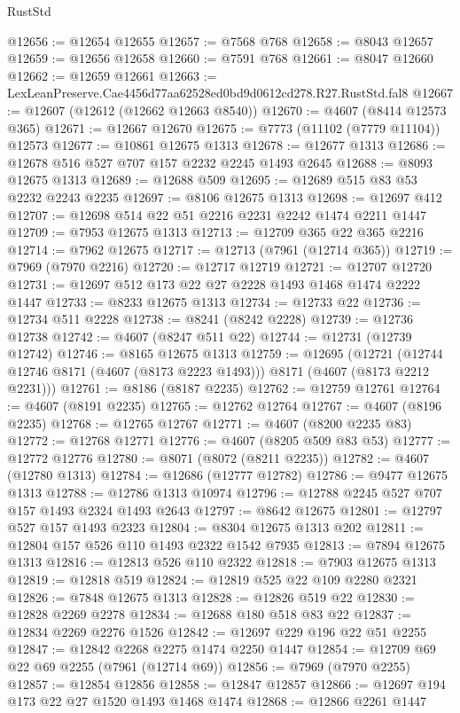 \begin{lexlean}{RustStd}
\begin{coremodule}
@12656 := @12654 @12655
@12657 := @7568 @768
@12658 := @8043 @12657
@12659 := @12656 @12658
@12660 := @7591 @768
@12661 := @8047 @12660
@12662 := @12659 @12661
@12663 := LexLeanPreserve.Cae4456d77aa62528ed0bd9d0612cd278.R27.RustStd.fal8
@12667 := @12607 (@12612 (@12662 @12663 @8540))
@12670 := @4607 (@8414 @12573 @365)
@12671 := @12667 @12670
@12675 := @7773 (@11102 (@7779 @11104)) @12573
@12677 := @10861 @12675 @1313
@12678 := @12677 @1313
@12686 := @12678 @516 @527 @707 @157 @2232 @2245 @1493 @2645
@12688 := @8093 @12675 @1313
@12689 := @12688 @509
@12695 := @12689 @515 @83 @53 @2232 @2243 @2235
@12697 := @8106 @12675 @1313
@12698 := @12697 @412
@12707 := @12698 @514 @22 @51 @2216 @2231 @2242 @1474 @2211 @1447
@12709 := @7953 @12675 @1313
@12713 := @12709 @365 @22 @365 @2216
@12714 := @7962 @12675
@12717 := @12713 (@7961 (@12714 @365))
@12719 := @7969 (@7970 @2216)
@12720 := @12717 @12719
@12721 := @12707 @12720
@12731 := @12697 @512 @173 @22 @27 @2228 @1493 @1468 @1474 @2222 @1447
@12733 := @8233 @12675 @1313
@12734 := @12733 @22
@12736 := @12734 @511 @2228
@12738 := @8241 (@8242 @2228)
@12739 := @12736 @12738
@12742 := @4607 (@8247 @511 @22)
@12744 := @12731 (@12739 @12742)
@12746 := @8165 @12675 @1313
@12759 := @12695
    (@12721 (@12744 @12746 @8171 (@4607 (@8173 @2223 @1493))) @8171 (@4607 (@8173 @2212 @2231)))
@12761 := @8186 (@8187 @2235)
@12762 := @12759 @12761
@12764 := @4607 (@8191 @2235)
@12765 := @12762 @12764
@12767 := @4607 (@8196 @2235)
@12768 := @12765 @12767
@12771 := @4607 (@8200 @2235 @83)
@12772 := @12768 @12771
@12776 := @4607 (@8205 @509 @83 @53)
@12777 := @12772 @12776
@12780 := @8071 (@8072 (@8211 @2235))
@12782 := @4607 (@12780 @1313)
@12784 := @12686 (@12777 @12782)
@12786 := @9477 @12675 @1313
@12788 := @12786 @1313 @10974
@12796 := @12788 @2245 @527 @707 @157 @1493 @2324 @1493 @2643
@12797 := @8642 @12675
@12801 := @12797 @527 @157 @1493 @2323
@12804 := @8304 @12675 @1313 @202
@12811 := @12804 @157 @526 @110 @1493 @2322 @1542 @7935
@12813 := @7894 @12675 @1313
@12816 := @12813 @526 @110 @2322
@12818 := @7903 @12675 @1313
@12819 := @12818 @519
@12824 := @12819 @525 @22 @109 @2280 @2321
@12826 := @7848 @12675 @1313
@12828 := @12826 @519 @22
@12830 := @12828 @2269 @2278
@12834 := @12688 @180 @518 @83 @22
@12837 := @12834 @2269 @2276 @1526
@12842 := @12697 @229 @196 @22 @51 @2255
@12847 := @12842 @2268 @2275 @1474 @2250 @1447
@12854 := @12709 @69 @22 @69 @2255 (@7961 (@12714 @69))
@12856 := @7969 (@7970 @2255)
@12857 := @12854 @12856
@12858 := @12847 @12857
@12866 := @12697 @194 @173 @22 @27 @1520 @1493 @1468 @1474
@12868 := @12866 @2261 @1447

\end{coremodule}
\end{lexlean}
